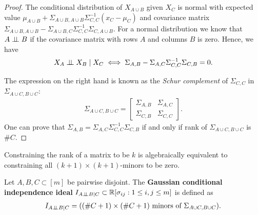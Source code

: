 \begin{proof}
  The conditional distribution of \( X_{A \cup B} \) given \( X_C \) is normal with expected value \(  \mu_{A \cup B} + \Sigma_{A \cup B,A \cup B}\Sigma_{C,C}^{-1}(x_C - \mu_C) \) and covariance matrix \( \Sigma_{A \cup B, A \cup B} -  \Sigma_{A \cup B, C} \Sigma_{C,C}^{-1} \Sigma_{C, A \cup B} \). For a normal distribution we know that \( A \perp \!\!\! \perp B \) if the covariance matrix with rows \( A \) and columns \( B \) is zero. Hence, we have
  \begin{align*}
    X_A \perp \!\!\! \perp X_B \mid X_C  \iff \Sigma_{A,B} - \Sigma_{A , C} \Sigma^{-1}_{C,C} \Sigma_{C,B} = 0.
  \end{align*}

  The expression on the right hand is known as the \emph{Schur complement} of \( \Sigma_{C,C} \) in \( \Sigma_{A \cup C, B \cup C} \):
  \begin{align*}
    \Sigma_{A \cup C, B \cup C} = \begin{bmatrix}
      \Sigma_{A,B} & \Sigma_{A,C} \\
      \Sigma_{C, B} & \Sigma_{C,C}
    \end{bmatrix}.
  \end{align*}
  One can prove that \( \Sigma_{A,B} = \Sigma_{A , C} \Sigma^{-1}_{C,C} \Sigma_{C,B} \) if and only if rank of \(  \Sigma_{A \cup C, B \cup C} \) is \( \# C \).
\end{proof}

Constraining the rank of a matrix to be \( k \) is algebraically equivalent to constraining all \( (k+1) \times (k+1) \)-minors to be zero.

\begin{mdframed}  
\begin{defi}
  Let \( A,B,C  \subset [m]\) be pairwise disjoint. The \textbf{Gaussian conditional independence ideal} \( I_{A \perp \!\!\! \perp B \mid C} \subset \mathbb R [\sigma_{ij} : 1 \leq i,j \leq m] \) is defined as 
  \begin{align*}
    I_{A \perp \!\!\! \perp B \mid C}  = ((\# C + 1) \times (\# C + 1) \text{ minors of } \Sigma_{A \cup C, B \cup C}).
  \end{align*}
\end{defi}
\end{mdframed}

